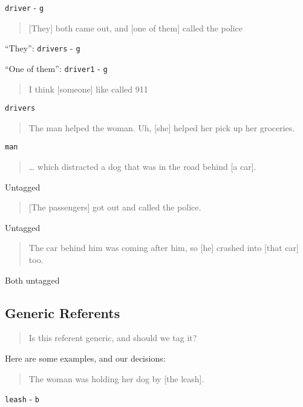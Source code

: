 \documentclass[
]{book}
\begin{document}
\texttt{driver} - \texttt{g}

\begin{quote}
{[}They{]} both came out, and {[}one of them{]} called the police
\end{quote}

``They'': \texttt{drivers} - \texttt{g}

``One of them'': \texttt{driver1} - \texttt{g}

\begin{quote}
I think {[}someone{]} like called 911
\end{quote}

\texttt{drivers}

\begin{quote}
The man helped the woman. Uh, {[}she{]} helped her pick up her groceries.
\end{quote}

\texttt{man}

\begin{quote}
\ldots{} which distracted a dog that was in the road behind {[}a car{]}.
\end{quote}

Untagged

\begin{quote}
{[}The passengers{]} got out and called the police.
\end{quote}

Untagged

\begin{quote}
The car behind him was coming after him, so {[}he{]} crashed into {[}that car{]} too.
\end{quote}

Both untagged

\hypertarget{generic-referents}{%
\subsection{Generic Referents}\label{generic-referents}}

\begin{quote}
Is this referent generic, and should we tag it?
\end{quote}

Here are some examples, and our decisions:

\begin{quote}
The woman was holding her dog by {[}the leash{]}.
\end{quote}

\texttt{leash} - \texttt{b}
\end{document}
